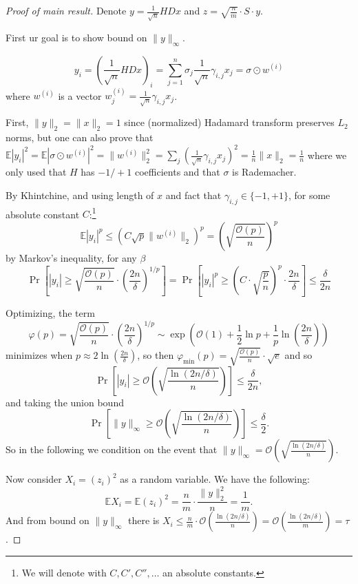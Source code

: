 \documentclass[11pt]{article}
\newcommand{\E}{{\mathbb E}}
\newcommand{\bigo}{\mathcal{O}}
\begin{document}
\begin{proof}[Proof of main result]
Denote $y = \frac{1}{\sqrt{n}}HDx$ and $z = \sqrt{\frac{n}{m}} \cdot S \cdot y$.


First ur goal is to show  bound on $\| y \|_{\infty}$.

$$y_i = (\frac{1}{\sqrt{n}}HDx)_i = \sum_{j=1}^n \sigma_j \frac{1}{\sqrt{n}} \gamma_{i,j} x_j = \sigma \odot w^{(i)}$$
where $w^{(i)}$ is a vector $w^{(i)}_j = \frac{1}{\sqrt{n}} \gamma_{i,j}x_j$.

First, $\|y\|_2 = \|x\|_2 = 1$ since (normalized) Hadamard transform preserves $L_2$ norms, but one can also prove that $\E |y_i|^2 = \E | \sigma \odot w^{(i)} |^2  = \|w^{(i)}\|_2^2 = \sum_j (\frac{1}{\sqrt{n}} \gamma_{i,j} x_j)^2 = \frac{1}{n} \|x\|_2 = \frac{1}{n}$ where we only used that $H$ has $-1/+1$ coefficients and that $\sigma$ is Rademacher.


By Khintchine, and using length of $x$ and fact that $\gamma_{i,j} \in \{-1,+1\}$, for some absolute constant $C$:\footnote{We will denote with $C,C',C'',\ldots$ an absolute constants.}
$$\E |y_i|^p \le \left(C \sqrt{p} \| w^{(i)} \|_2\right)^{p} = \left(\sqrt{\frac{\bigo(p)}{n}}\right)^p$$
by Markov's inequality, for any $\beta$
$$\Pr\left[ |y_i| \ge \sqrt{\frac{\bigo(p)}{n}} \cdot \left( \frac{2n}{\delta} \right)^{1/p}\right] = \Pr\left[ |y_i|^p \ge  \left(C \cdot \sqrt{\frac{p}{n}}\right)^p \cdot \frac{2n}{\delta} \right] \le \frac{\delta}{2n}$$

Optimizing, the term
$$\varphi(p) =  \sqrt{\frac{\bigo(p)}{n}} \cdot \left( \frac{2n}{\delta} \right)^{1/p} \sim \exp\left(\bigo(1)+\frac{1}{2} \ln p + \frac{1}{p} \ln \left( \frac{2n}{\delta} \right) \right)$$
minimizes when $p \approx  2 \ln \left( \frac{2n}{\delta} \right) $, so then $ \varphi_{\min}(p)= \sqrt{\frac{\bigo(p)}{n}}\cdot \sqrt{e}$ and so
$$\Pr\left[ |y_i| \ge  \bigo\left( \sqrt{\frac{\ln (2n/\delta)}{n}} \right)\right] \le \frac{\delta}{2n},$$
and taking the union bound
$$\Pr\left[ \|y\|_\infty \ge  \bigo\left(\sqrt{\frac{\ln (2n/\delta)}{n}}\right) \right] \le \frac{\delta}{2}.$$
So in the following we condition on the event that $\| y \|_\infty = \bigo\left(\sqrt{\frac{\ln (2n/\delta)}{n}}\right)$.

Now consider $X_i = (z_i)^2$ as a random variable. We have the following:
$$\E X_i = \E (z_i)^2 = \frac{n}{m} \cdot \frac{\|y\|_2^2}{n} = \frac{1}{m}.$$
And from bound on $\|y\|_\infty$ there is $X_i \le \frac{n}{m} \cdot \bigo(\frac{\ln(2n/\delta)}{n} )= \bigo(\frac{\ln(2n/\delta)}{m}) = \tau$.



\end{proof}
\end{document}
